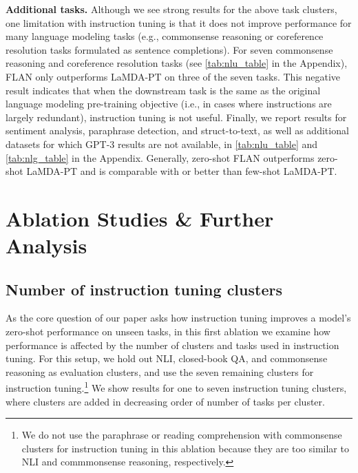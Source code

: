\documentclass{article} %
\newcommand{\flan}{FLAN}
\newcommand{\baselm}{LaMDA-PT}
\begin{document}
\newcommand{\explainwewin}[0]{The triangle \textcolor{jweigreen}{\scriptsize$\blacktriangle$} indicates improvement over few-shot GPT-3.}
\newcommand{\explainwekindawin}[0]{The up-arrow \textcolor{jweigreen}{\scriptsize$\uparrow$} indicates improvement only over zero-shot GPT-3.}
\newcommand{\gptvala}[3]{& #1 & #2 {\tiny #3}}
\newcommand{\baselmvala}[3]{& #1 & #2 {\tiny [#3]}}
\newcommand{\flanvala}[3]{& #1{\tiny $\pm$#2} & #3}
\newcommand{\na}[0]{\makecell[c]{--}}
\newcommand{\explainkt}[0]{{\scriptsize $[k]$} indicates the number of few-shot exemplars. {\scriptsize \#$t$} indicates the number of templates that FLAN is evaluated on.}
\newcommand{\fewk}[1]{{\tiny [#1]}}
 
 








\textbf{Additional tasks.}
Although we see strong results for the above task clusters, one limitation with instruction tuning is that it does not improve performance for many language modeling tasks (e.g., commonsense reasoning or coreference resolution tasks formulated as sentence completions).
For seven commonsense reasoning and coreference resolution tasks (see \cref{tab:nlu_table} in the Appendix), \flan{} only outperforms \baselm{} on three of the seven tasks.
This negative result indicates that when the downstream task is the same as the original language modeling pre-training objective (i.e., in cases where instructions are largely redundant), instruction tuning is not useful.
Finally, we report results for sentiment analysis, paraphrase detection, and struct-to-text, as well as additional datasets for which GPT-3 results are not available, in \cref{tab:nlu_table} and \cref{tab:nlg_table} in the Appendix.
Generally, zero-shot \flan{} outperforms zero-shot \baselm{} and is comparable with or better than few-shot \baselm{}.

\section{Ablation Studies \& Further Analysis}

\subsection{Number of instruction tuning clusters}\label{subsec:finetuning_clusters}
As the core question of our paper asks how instruction tuning improves a model's zero-shot performance on unseen tasks, in this first ablation we examine how performance is affected by the number of clusters and tasks used in instruction tuning.
For this setup, we hold out NLI, closed-book QA, and commonsense reasoning as evaluation clusters, and use the seven remaining clusters for instruction tuning.\footnote{We do not use the paraphrase or reading comprehension with commonsense clusters for instruction tuning in this ablation because they are too similar to NLI and commmonsense reasoning, respectively.}
We show results for one to seven instruction tuning clusters, where clusters are added in decreasing order of number of tasks per cluster.
\end{document}
